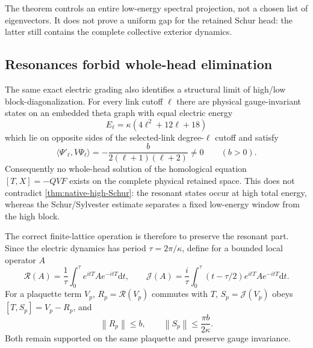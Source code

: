 \documentclass[11pt,oneside,openany]{book}
\theoremstyle{definition}
\theoremstyle{remark}
\newcommand{\dd}{\mathrm d}
\newcommand{\norm}[1]{\left\lVert#1\right\rVert}
\newcommand{\src}[2]{\cite[#2]{#1}}
\begin{document}
The theorem controls an entire low-energy spectral projection, not a
chosen list of eigenvectors.  It does not prove a uniform gap for the
retained Schur head: the latter still contains the complete collective
exterior dynamics.

\subsection{Resonances forbid whole-head elimination}
The same exact electric grading also identifies a structural limit of
high/low block-diagonalization.  For every link cutoff $\ell$ there are
physical gauge-invariant states on an embedded theta graph with equal
electric energy
\begin{equation}\label{eq:native-resonant-energy}
 E_\ell=\kappa(4\ell^2+12\ell+18)
\end{equation}
which lie on opposite sides of the selected-link degree-$\ell$ cutoff
and satisfy
\begin{equation}\label{eq:native-resonant-matrix-element}
 \langle\Psi'_\ell,V\Psi_\ell\rangle
 =-\frac{b}{2(\ell+1)(\ell+2)}\ne0\qquad(b>0).
\end{equation}
Consequently no whole-head solution of the homological equation
$[T,X]=-QVF$ exists on the complete physical retained space.  This does
not contradict \cref{thm:native-high-Schur}: the resonant states occur
at high total energy, whereas the Schur/Sylvester estimate separates a
fixed low-energy window from the high block.  \src{F17}{V100}

The correct finite-lattice operation is therefore to preserve the
resonant part.  Since the electric dynamics has period
$\tau=2\pi/\kappa$, define for a bounded local operator $A$
\begin{equation}\label{eq:native-resonant-average}
 \mathcal R(A)=\frac1\tau\int_0^\tau e^{itT}Ae^{-itT}\dd t,
 \qquad
 \mathcal J(A)=\frac{i}{\tau}\int_0^\tau
        (t-\tau/2)e^{itT}Ae^{-itT}\dd t.
\end{equation}
For a plaquette term $V_p$, $R_p=\mathcal R(V_p)$ commutes with $T$,
$S_p=\mathcal J(V_p)$ obeys $[T,S_p]=V_p-R_p$, and
\begin{equation}\label{eq:native-resonant-local-bounds}
 \norm{R_p}\le b,\qquad \norm{S_p}\le\frac{\pi b}{2\kappa}.
\end{equation}
Both remain supported on the same plaquette and preserve gauge
invariance.
\end{document}
